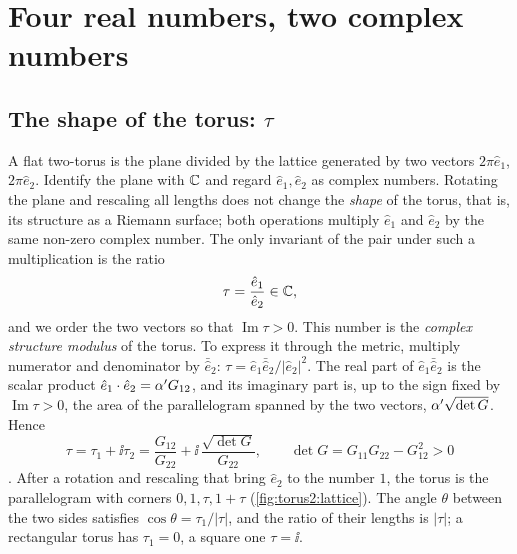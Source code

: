 \section{Four real numbers, two complex numbers}\label{sec:torus2:moduli}

\subsection{The shape of the torus: \texorpdfstring{$\tau$}{tau}}

A flat two-torus is the plane divided by the lattice generated by two vectors
$2\pi\hat e_1$, $2\pi\hat e_2$. Identify the plane with $\mathbb{C}$ and regard $\hat e_1,\hat e_2$ as
complex numbers. Rotating the plane and rescaling all lengths does not change the
\emph{shape} of the torus, that is, its structure as a Riemann surface; both operations
multiply $\hat e_1$ and $\hat e_2$ by the same non-zero complex number. The only invariant of
the pair under such a multiplication is the ratio
\begin{equation}\label{eq:torus2:taudef}
 \tau=\frac{\hat e_1}{\hat e_2}\in\mathbb{C} ,
\end{equation}
and we order the two vectors so that $\operatorname{Im}\tau>0$. This number is the
\emph{complex structure modulus} of the torus. To express
it through the metric, multiply numerator and denominator by $\bar{\hat e}_2$:
$\tau=\hat e_1\bar{\hat e}_2/|\hat e_2|^2$. The real part of $\hat e_1\bar{\hat e}_2$ is the
scalar product $\hat e_1\cdot\hat e_2=\alpha' G_{12}$, and its imaginary part is, up to the sign
fixed by $\operatorname{Im}\tau>0$, the area of the parallelogram spanned by the two vectors,
$\alpha'\sqrt{\det G}$. Hence
\begin{equation}\label{eq:torus2:tau}
 \tau=\tau_1+\ii\tau_2=\frac{G_{12}}{G_{22}}+\ii\,\frac{\sqrt{\det G}}{G_{22}},
 \qquad \det G=G_{11}G_{22}-G_{12}^2>0
\end{equation}
. After a rotation and rescaling that bring
$\hat e_2$ to the number $1$, the torus is the parallelogram with corners $0,1,\tau,1+\tau$
(\cref{fig:torus2:lattice}). The angle $\theta$ between the two sides satisfies
$\cos\theta=\tau_1/|\tau|$, and the ratio of their lengths is $|\tau|$; a rectangular torus
has $\tau_1=0$, a square one $\tau=\ii$.

